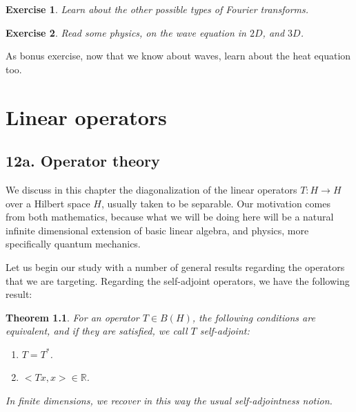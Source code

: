 \documentclass[12pt]{amsbook}
\newtheorem{theorem}{Theorem}[chapter]
\newtheorem{exercise}[theorem]{Exercise}
\begin{document}
\begin{exercise}
Learn about the other possible types of Fourier transforms.
\end{exercise}

\begin{exercise}
Read some physics, on the wave equation in $2D$, and $3D$.
\end{exercise}

As bonus exercise, now that we know about waves, learn about the heat equation too.

\chapter{Linear operators}

\section*{12a. Operator theory}

We discuss in this chapter the diagonalization of the linear operators $T:H\to H$ over a Hilbert space $H$, usually taken to be separable. Our motivation comes from both mathematics, because what we will be doing here will be a natural infinite dimensional extension of basic linear algebra, and physics, more specifically quantum mechanics.

\bigskip

Let us begin our study with a number of general results regarding the operators that we are targeting. Regarding the self-adjoint operators, we have the following result:


\begin{theorem}
For an operator $T\in B(H)$, the following conditions are equivalent, and if they are satisfied, we call $T$ self-adjoint:
\begin{enumerate}
\item $T=T^*$.

\item $<Tx,x>\in\mathbb R$.
\end{enumerate}
In finite dimensions, we recover in this way the usual self-adjointness notion.
\end{theorem}
\end{document}

